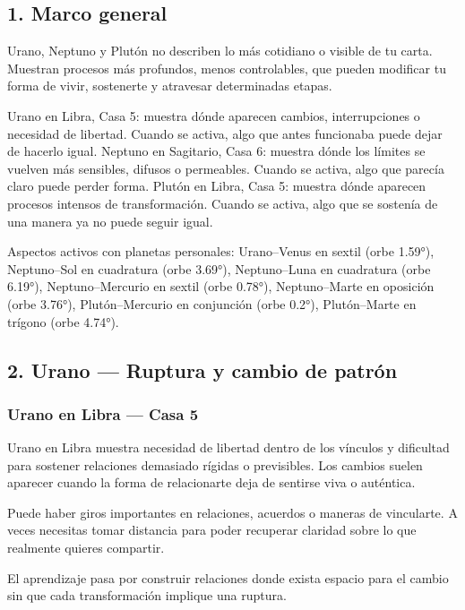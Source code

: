 \documentclass[11pt,a4paper]{article}
\begin{document}
\subsection{1. Marco general}

Urano, Neptuno y Plutón no describen lo más cotidiano o visible de tu carta. Muestran procesos más profundos, menos controlables, que pueden modificar tu forma de vivir, sostenerte y atravesar determinadas etapas.

Urano en Libra, Casa 5: muestra dónde aparecen cambios, interrupciones o necesidad de libertad. Cuando se activa, algo que antes funcionaba puede dejar de hacerlo igual.
Neptuno en Sagitario, Casa 6: muestra dónde los límites se vuelven más sensibles, difusos o permeables. Cuando se activa, algo que parecía claro puede perder forma.
Plutón en Libra, Casa 5: muestra dónde aparecen procesos intensos de transformación. Cuando se activa, algo que se sostenía de una manera ya no puede seguir igual.

Aspectos activos con planetas personales: Urano–Venus en sextil (orbe 1.59°), Neptuno–Sol en cuadratura (orbe 3.69°), Neptuno–Luna en cuadratura (orbe 6.19°), Neptuno–Mercurio en sextil (orbe 0.78°), Neptuno–Marte en oposición (orbe 3.76°), Plutón–Mercurio en conjunción (orbe 0.2°), Plutón–Marte en trígono (orbe 4.74°).

\vspace{0.8cm}


\subsection{2. Urano — Ruptura y cambio de patrón}

\subsubsection*{Urano en Libra — Casa 5}

Urano en Libra muestra necesidad de libertad dentro de los vínculos y dificultad para sostener relaciones demasiado rígidas o previsibles. Los cambios suelen aparecer cuando la forma de relacionarte deja de sentirse viva o auténtica.

Puede haber giros importantes en relaciones, acuerdos o maneras de vincularte. A veces necesitas tomar distancia para poder recuperar claridad sobre lo que realmente quieres compartir.

El aprendizaje pasa por construir relaciones donde exista espacio para el cambio sin que cada transformación implique una ruptura.
\end{document}
